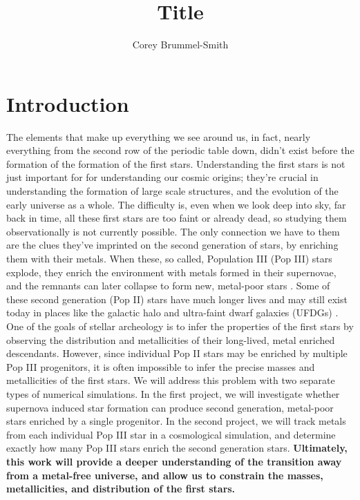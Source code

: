 \documentclass[a4paper, 12pt]{article}
\begin{document}
\fontsize{12}{16}\selectfont
\author{Corey Brummel-Smith}
\title{Title}



\section{Introduction}

The elements that make up everything we see around us, in fact, nearly everything from the second row of the periodic table down, didn't exist before the formation of the formation of the first stars. Understanding the first stars is not just important for for understanding our cosmic origins; they're crucial in understanding the formation of large scale structures, and the evolution of the early universe as a whole. The difficulty is, even when we look deep into sky, far back in time, all these first stars are too faint or already dead, so studying them observationally is not currently possible. The only connection we have to them are the clues they've imprinted on the second generation of stars, by enriching them with their metals. When these, so called, Population III (Pop III) stars explode, they enrich the environment with metals formed in their supernovae, and the remnants can later collapse to form new, metal-poor stars \cite{...}. Some of these second generation (Pop II) stars have much longer lives and may still exist today in places like the galactic halo and ultra-faint dwarf galaxies (UFDGs) \citep{...}. One of the goals of stellar archeology is to infer the properties of the first stars by observing the distribution and metallicities of their long-lived, metal enriched descendants. However, since individual Pop II stars may be enriched by multiple Pop III progenitors, it is often impossible to infer the precise masses and metallicities of the first stars. We will address this problem with two separate types of numerical simulations. In the first project, we will investigate whether supernova induced star formation can produce second generation, metal-poor stars enriched by a single progenitor. In the second project, we will track metals from each individual Pop III star in a cosmological simulation, and determine exactly how many Pop III stars enrich the second generation stars. \textbf{Ultimately, this work will provide a deeper understanding of the transition away from a metal-free universe, and allow us to constrain the masses, metallicities, and distribution of the first stars.}
\end{document}
